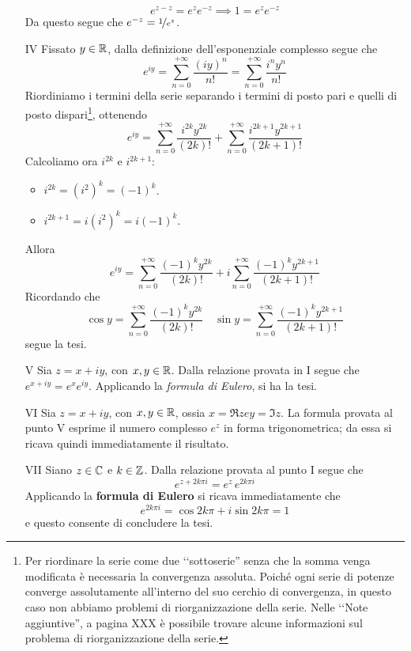 \begin{demonstration}
\begin{enumerate}[label=\Roman*]
\begin{equation*}
	e^{z-z}  = e^{z}e^{-z}\implies 1 = e^{z}e^{-z}
\end{equation*}
Da questo segue che $e^{-z} = \nicefrac{1}{e^z}$.
\item[IV] Fissato $y\in\mathbb{R}$, dalla definizione dell'esponenziale complesso segue che
\begin{equation*}
	e^{iy}=\sum_{n=0}^{+\infty}\frac{\left(iy\right)^n}{n!}=\sum_{n=0}^{+\infty}\frac{i^ny^n}{n!}
\end{equation*}
Riordiniamo i termini della serie separando i termini di posto pari e quelli di posto dispari\footnote{Per riordinare la serie come due ‘‘sottoserie'' senza che la somma venga modificata è necessaria la convergenza assoluta. Poiché ogni serie di potenze converge assolutamente all'interno del suo cerchio di convergenza, in questo caso non abbiamo problemi di riorganizzazione della serie. Nelle ‘‘Note aggiuntive'', a pagina XXX è possibile trovare alcune informazioni sul problema di riorganizzazione della serie.}, ottenendo
\begin{equation*}
	e^{iy}=\sum_{n=0}^{+\infty}\frac{i^{2k}y^{2k}}{\left(2k\right)!}+\sum_{n=0}^{+\infty}\frac{i^{2k+1}y^{2k+1}}{\left(2k+1\right)!}
\end{equation*}
Calcoliamo ora $i^{2k}$ e $i^{2k+1}$:
\begin{itemize}
	\item $i^{2k}=\left(i^2\right)^k=\left(-1\right)^k$.
	\item $i^{2k+1}=i\left(i^2\right)^k=i\left(-1\right)^k$.
\end{itemize}
Allora
\begin{equation*}
	e^{iy}=\sum_{n=0}^{+\infty}\frac{\left(-1\right)^ky^{2k}}{\left(2k\right)!}+i\sum_{n=0}^{+\infty}\frac{\left(-1\right)^ky^{2k+1}}{\left(2k+1\right)!}
\end{equation*}
Ricordando che
\begin{equation*}
	\cos y=\sum_{n=0}^{+\infty}\frac{\left(-1\right)^ky^{2k}}{\left(2k\right)!}\quad
	\sin y=\sum_{n=0}^{+\infty}\frac{\left(-1\right)^ky^{2k+1}}{\left(2k+1\right)!}
\end{equation*}
segue la tesi.
\item[V] Sia $z=x+iy$, con $x,y\in\mathbb{R}$. Dalla relazione provata in I segue che $e^{x+iy}=e^xe^{iy}$. Applicando la \textit{formula di Eulero}, si ha la tesi.
\item[VI] Sia $z=x+iy$, con $x,y\in \mathbb{R}$, ossia $x=\Re z e y=\Im z$. 
La formula provata al punto V esprime il numero complesso $e^z$ in forma trigonometrica; da essa si ricava quindi immediatamente il risultato.
\item[VII]  Siano $z\in \mathbb{C}$ e $k\in \mathbb{Z}$. Dalla relazione provata al punto I segue che 
\begin{equation*}
	e^{z+2k\pi i}=e^{z}\, e^{2k\pi i}
\end{equation*}
Applicando la \textbf{formula di Eulero} si ricava immediatamente che 
\begin{equation*}
	e^{2k\pi i}=\cos 2k\pi +i\sin 2k\pi =1
\end{equation*}
e questo consente di concludere la tesi.
\end{enumerate}
\end{demonstration}

